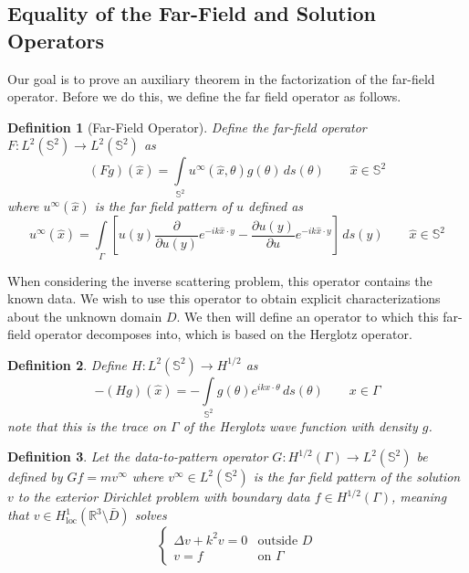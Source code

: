 \documentclass[]{article}
\newtheorem{definition}{Definition}
\newcommand{\R}{\mathbb R}
\renewcommand{\S}{\mathbb S}
\begin{document}
			\subsection{Equality of the Far-Field and Solution Operators}
				Our goal is to prove an auxiliary theorem in the factorization of the far-field operator. Before we do this, we define the far field operator as follows.
				\begin{definition}[Far-Field Operator]
					Define the far-field operator $F:L^2(\mathbb S^2) \to L^2(\mathbb S^2)$ as
					\begin{equation}	
						(Fg)(\hat x) = \int\limits_{\mathbb S^2}u^\infty(\hat x, \theta)g(\theta)\, ds(\theta) \qquad \hat x\in \S^2
					\end{equation}
					where $u^\infty(\hat x)$ is the far field pattern of $u$ defined as
					\begin{equation}
						u^\infty(\hat x) = \int\limits_\Gamma\left[u(y)\frac{\partial }{\partial u(y)}e^{-ik\hat x\cdot y} - \frac{\partial u(y)}{\partial u}e^{-ik\hat x\cdot y}\right]\, ds(y) \qquad \hat x\in \S^2
					\end{equation}
				\label{def:F}
				\end{definition}
				When considering the inverse scattering problem, this operator contains the known data. We wish to use this operator to obtain explicit characterizations about the unknown domain $D$. 
				We then will define an operator to which this far-field operator decomposes into, which is based on the Herglotz operator.
				\begin{definition}
					\label{def:H}
					Define $H: L^2(\mathbb S^2) \to H^{1/2}$ as
					\begin{equation}
						-(Hg)(\hat x) = -\int\limits_{\mathbb S^2}g(\theta)e^{ikx\cdot \theta}\,ds(\theta) \qquad x\in \Gamma
					\end{equation}
					note that this is the trace on $\Gamma$ of the Herglotz wave function with density $g$.
				\end{definition}
				\begin{definition}
					\label{def:G}
					Let the data-to-pattern operator $G: H^{1/2}(\Gamma)\to L^2(\S^2)$ be defined by $Gf =m v^\infty$ where $v^\infty \in L^2(\S^2)$ is the far field pattern of the solution $v$ to the exterior Dirichlet problem with boundary data $f\in H^{1/2}(\Gamma)$, meaning that $v\in H^1_{\text{loc}}(\R^3\setminus\bar D)$ solves 
					\begin{equation}
						\begin{cases}
							\Delta v + k^2v = 0 &\text{outside }D\\
							v = f & \text{on } \Gamma
						\end{cases}
					\end{equation}
				\end{definition}
\end{document}
